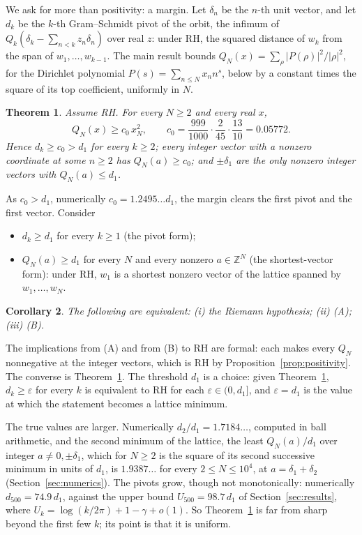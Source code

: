 \documentclass[11pt]{article}
\newtheorem{theorem}{Theorem}[section]
\newtheorem{corollary}[theorem]{Corollary}
\theoremstyle{definition}
\begin{document}
We ask for more than positivity: a margin. Let $\delta_n$ be the $n$-th unit vector, and let $d_k$ be the $k$-th
Gram--Schmidt pivot of the orbit, the infimum of $Q_k(\delta_k - \sum_{n < k} z_n \delta_n)$ over real $z$: under RH,
the squared distance of $w_k$ from the span of $w_1, \dots, w_{k - 1}$. The main result bounds $Q_N(x) = \sum_\rho
|P(\rho)|^2/|\rho|^2$, for the Dirichlet polynomial $P(s) = \sum_{n \le N} x_n n^s$, below by a constant times the
square of its top coefficient, uniformly in $N$.

\begin{theorem}\label{thm:margin}
Assume RH. For every $N \ge 2$ and every real $x$,
\[
Q_N(x) \ge c_0\, x_N^2, \qquad c_0 = \frac{999}{1000} \cdot \frac{2}{45} \cdot \frac{13}{10} = 0.05772.
\]
Hence $d_k \ge c_0 > d_1$ for every $k \ge 2$; every integer vector with a nonzero coordinate at some $n \ge 2$
has $Q_N(a) \ge c_0$; and $\pm\delta_1$ are the only nonzero integer vectors with $Q_N(a) \le d_1$.
\end{theorem}

As $c_0 > d_1$, numerically $c_0 = 1.2495\ldots d_1$, the margin clears the first pivot and the first vector.
Consider
\begin{itemize}
\item[(A)] $d_k \ge d_1$ for every $k \ge 1$ (the pivot form);
\item[(B)] $Q_N(a) \ge d_1$ for every $N$ and every nonzero $a \in \mathbb Z^N$ (the shortest-vector form): under RH,
$w_1$ is a shortest nonzero vector of the lattice spanned by $w_1, \dots, w_N$.
\end{itemize}

\begin{corollary}\label{thm:main}
The following are equivalent: \textup{(i)} the Riemann hypothesis; \textup{(ii)} \textup{(A)}; \textup{(iii)}
\textup{(B)}.
\end{corollary}

The implications from (A) and from (B) to RH are formal: each makes every $Q_N$ nonnegative at the integer vectors,
which is RH by Proposition~\ref{prop:positivity}. The converse is Theorem~\ref{thm:margin}. The threshold $d_1$ is a
choice: given Theorem~\ref{thm:margin}, $d_k \ge \varepsilon$
for every $k$ is equivalent to RH for each $\varepsilon \in
(0, d_1]$, and $\varepsilon = d_1$ is the value at which the statement becomes a lattice minimum.

The true values are larger. Numerically $d_2/d_1 = 1.7184\ldots$, computed in ball arithmetic, and the second minimum
of the lattice, the least $Q_N(a)/d_1$ over integer $a \ne 0, \pm\delta_1$, which for $N \ge 2$ is the square of its
second successive minimum in units of $d_1$, is $1.9387\ldots$ for every $2 \le N \le 10^4$, at $a = \delta_1 +
\delta_2$ (Section~\ref{sec:numerics}). The pivots grow, though not monotonically: numerically $d_{500} = 74.9\,d_1$,
against the upper bound $U_{500} = 98.7\,d_1$ of Section~\ref{sec:results}, where $U_k = \log(k/2\pi) + 1 - \gamma +
o(1)$. So Theorem~\ref{thm:margin} is far from sharp beyond the first few $k$; its point is that it is uniform.
\end{document}
